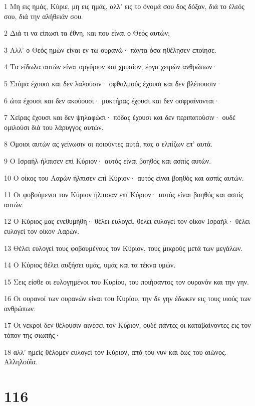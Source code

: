 \par 1 Μη εις ημάς, Κύριε, μη εις ημάς, αλλ' εις το όνομά σου δος δόξαν, διά το έλεός σου, διά την αλήθειάν σου.
\par 2 Διά τι να είπωσι τα έθνη, και που είναι ο Θεός αυτών;
\par 3 Αλλ' ο Θεός ημών είναι εν τω ουρανώ· πάντα όσα ηθέλησεν εποίησε.
\par 4 Τα είδωλα αυτών είναι αργύριον και χρυσίον, έργα χειρών ανθρώπων·
\par 5 Στόμα έχουσι και δεν λαλούσιν· οφθαλμούς έχουσι και δεν βλέπουσιν·
\par 6 ώτα έχουσι και δεν ακούουσι· μυκτήρας έχουσι και δεν οσφραίνονται·
\par 7 Χείρας έχουσι και δεν ψηλαφώσι· πόδας έχουσι και δεν περιπατούσιν· ουδέ ομιλούσι διά του λάρυγγος αυτών.
\par 8 Όμοιοι αυτών ας γείνωσιν οι ποιούντες αυτά, πας ο ελπίζων επ' αυτά.
\par 9 Ο Ισραήλ ήλπισεν επί Κύριον· αυτός είναι βοηθός και ασπίς αυτών.
\par 10 Ο οίκος του Ααρών ήλπισεν επί Κύριον· αυτός είναι βοηθός και ασπίς αυτών.
\par 11 Οι φοβούμενοι τον Κύριον ήλπισαν επί Κύριον· αυτός είναι βοηθός και ασπίς αυτών.
\par 12 Ο Κύριος μας ενεθυμήθη· θέλει ευλογεί, θέλει ευλογεί τον οίκον Ισραήλ· θέλει ευλογεί τον οίκον Ααρών.
\par 13 Θέλει ευλογεί τους φοβουμένους τον Κύριον, τους μικρούς μετά των μεγάλων.
\par 14 Ο Κύριος θέλει αυξήσει υμάς, υμάς και τα τέκνα υμών.
\par 15 Σεις είσθε οι ευλογημένοι του Κυρίου, του ποιήσαντος τον ουρανόν και την γην.
\par 16 Οι ουρανοί των ουρανών είναι του Κυρίου, την δε γην έδωκεν εις τους υιούς των ανθρώπων.
\par 17 Οι νεκροί δεν θέλουσιν αινέσει τον Κύριον, ουδέ πάντες οι καταβαίνοντες εις τον τόπον της σιωπής·
\par 18 αλλ' ημείς θέλομεν ευλογεί τον Κύριον, από του νυν και έως του αιώνος. Αλληλούϊα.

\chapter{116}

